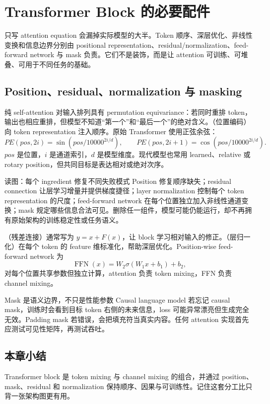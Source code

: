 \section{Transformer Block 的必要配件}

只写 attention equation 会漏掉实际模型的大半。Token 顺序、深层优化、非线性变换和信息边界分别由 positional representation、residual/normalization、feed-forward network 与 mask 负责。它们不是装饰，而是让 attention 可训练、可堆叠、可用于不同任务的基础。

\subsection{Position、residual、normalization 与 masking}

纯 self-attention 对输入排列具有 permutation equivariance：若同时重排 token，输出也相应重排，但模型不知道“第一个”和“最后一个”的绝对含义。（位置编码）向 token representation 注入顺序。原始 Transformer 使用正弦余弦：
\[
PE(pos,2i)=\sin\!\left(pos/10000^{2i/d}\right),\qquad
PE(pos,2i+1)=\cos\!\left(pos/10000^{2i/d}\right).
\]
$pos$ 是位置，$i$ 是通道索引，$d$ 是模型维度。现代模型也常用 learned、relative 或 rotary position，但共同目标是表达相对或绝对次序。


\begin{knowledgebox}{读图：每个 ingredient 修复不同失败模式}
Position 修复顺序缺失；residual connection 让层学习增量并提供梯度捷径；layer normalization 控制每个 token representation 的尺度；feed-forward network 在每个位置独立加入非线性通道变换；mask 规定哪些信息合法可见。删除任一组件，模型可能仍能运行，却不再拥有原始架构的训练稳定性或任务语义。
\end{knowledgebox}

（残差连接）通常写为 $y=x+F(x)$，让 block 学习相对输入的修正。（层归一化）在每个 token 的 feature 维标准化，帮助深层优化。Position-wise feed-forward network 为
\[
\operatorname{FFN}(x)=W_2\sigma(W_1x+b_1)+b_2,
\]
对每个位置共享参数但独立计算，attention 负责 token mixing，FFN 负责 channel mixing。

\begin{warningbox}{Mask 是语义边界，不只是性能参数}
Causal language model 若忘记 causal mask，训练时会看到目标 token 右侧的未来信息，loss 可能异常漂亮但生成完全无效。Padding mask 若错误，会把填充符当真实内容。任何 attention 实现首先应测试可见性矩阵，再测试吞吐。
\end{warningbox}

\subsection{本章小结}

Transformer block 是 token mixing 与 channel mixing 的组合，并通过 position、mask、residual 和 normalization 保持顺序、因果与可训练性。记住这套分工比只背一张架构图更有用。

